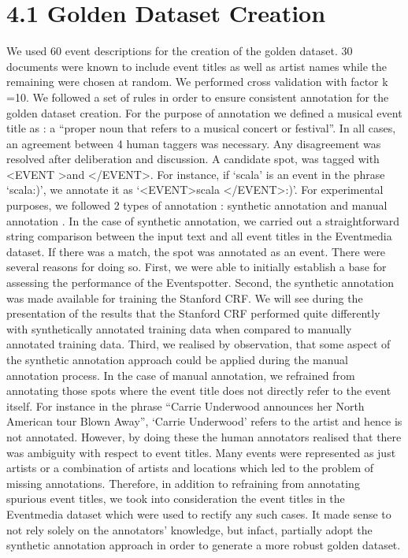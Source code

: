 \documentclass[a4paper,11pt]{report}
\begin{document}
\section*{4.1 Golden Dataset Creation}
We used 60 event descriptions for the creation of the golden dataset. 30 documents were known to include event titles as well as artist names while the remaining were chosen at random. We performed cross validation with factor k =10. We followed a set of rules in order to ensure consistent annotation for the golden dataset creation. For the purpose of annotation we defined a musical event title as : a ``proper noun that refers to a musical concert or festival''. In all cases, an agreement between 4 human taggers was necessary. Any disagreement was resolved after deliberation and discussion. A candidate spot, was tagged with \textless EVENT \textgreater  and \textless /EVENT\textgreater. For instance, if `scala' is an event in the phrase `scala:)', we annotate it as `\textless EVENT\textgreater scala \textless /EVENT\textgreater:)'. For experimental purposes, we followed 2 types of annotation : synthetic annotation and manual annotation . 
	In the case of synthetic annotation, we carried out a straightforward string comparison between the input text and all event titles in the Eventmedia dataset. If there was a match, the spot was annotated as an event. There were several reasons for doing so. First, we were able to initially establish a base for assessing the performance of the Eventspotter. Second, the synthetic annotation was made available for training the Stanford CRF. We will see during the presentation of the results that the Stanford CRF performed quite differently with synthetically annotated training data when compared to manually annotated training data. Third, we realised by observation, that some aspect of the synthetic annotation approach could be applied during the manual annotation process.
	In the case of manual annotation, we refrained from annotating those spots where the event title does not directly refer to the event itself. For instance in the phrase ``Carrie Underwood announces her North American tour Blown Away'', `Carrie Underwood' refers to the artist and hence is not annotated. However, by doing these the human annotators realised that there was ambiguity with respect to event titles. Many events were represented as just artists or a combination of artists and locations which led to the problem of missing annotations. Therefore, in addition to refraining from annotating spurious event titles, we took into consideration the event titles in the Eventmedia dataset which were used to rectify any such cases. It made sense to not rely solely on the annotators’ knowledge, but infact, partially adopt the synthetic annotation approach in order to generate a more robust golden dataset.
\end{document}
